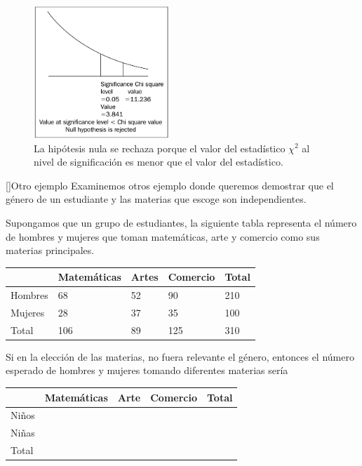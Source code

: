 \begin{figure}
	\centering
	\includegraphics[height=5cm,keepaspectratio=true]{./images/kum0407.png}
	\caption{La hipótesis nula se rechaza porque el valor del estadístico $\chi^2$ al nivel de significación es menor que el valor del estadístico.}
	\label{fig:0407}
\end{figure}


[]{Otro ejemplo}
Examinemos otros ejemplo donde queremos demostrar que el género de un estudiante y las materias que escoge son independientes.


Supongamos que un grupo de estudiantes, la siguiente tabla representa el número de hombres y mujeres que toman matemáticas, arte y comercio como sus materias principales.


\begin{center}
	\begin{tabular}{|l|l|l|l|l|}\hline
		& Matemáticas & Artes & Comercio & Total\\\hline
		Hombres & 68 & 52 & 90 & 210\\\hline
		Mujeres & 28 & 37 & 35 & 100\\\hline
		Total & 106 & 89 & 125 & 310\\\hline
	\end{tabular}
\end{center}



Si en la elección de las materias, no fuera relevante el género, entonces el número esperado de hombres y mujeres tomando diferentes materias sería
\begin{center}
	\begin{tabular}{|l|l|l|l|l|}\hline
		& Matemáticas & Arte & Comercio & Total\\\hline
		Niños &  &  &  & \\\hline
		Niñas &  &  &  & \\\hline
		Total &  &  &  & \\\hline
	\end{tabular}
\end{center}



